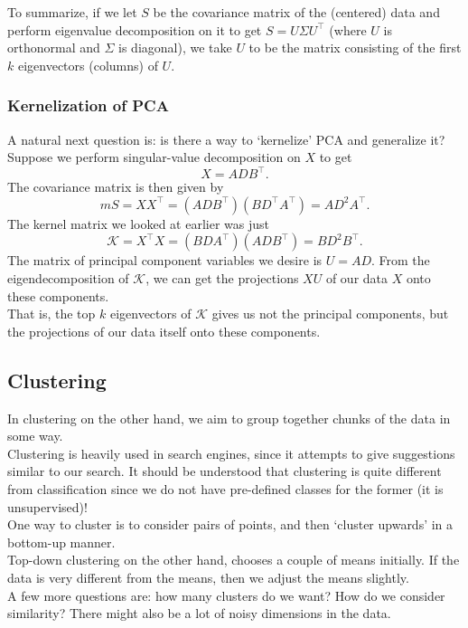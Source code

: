 \documentclass{article}
\begin{document}
			To summarize, if we let $S$ be the covariance matrix of the (centered) data and perform eigenvalue decomposition on it to get $S = U \Sigma U^\top$ (where $U$ is orthonormal and $\Sigma$ is diagonal), we take $U$ to be the matrix consisting of the first $k$ eigenvectors (columns) of $U$. 

		\subsubsection{Kernelization of PCA}

			A natural next question is: is there a way to `kernelize' PCA and generalize it? Suppose we perform singular-value decomposition on $X$ to get
			\[ X = ADB^\top. \]
			The covariance matrix is then given by
			\[ mS = XX^\top = (ADB^\top) (BD^\top A^\top) = AD^2A^\top. \]
			The kernel matrix we looked at earlier was just
			\[ \mathcal{K} = X^\top X = (BDA^\top) (ADB^\top) = BD^2B^\top. \]
			The matrix of principal component variables we desire is $U = AD$. From the eigendecomposition of $\mathcal{K}$, we can get the projections $XU$ of our data $X$ onto these components.\\
			That is, the top $k$ eigenvectors of $\mathcal{K}$ gives us not the principal components, but the projections of our data itself onto these components.


	\subsection{Clustering}

		In clustering on the other hand, we aim to group together chunks of the data in some way.\\
		Clustering is heavily used in search engines, since it attempts to give suggestions similar to our search. It should be understood that clustering is quite different from classification since we do not have pre-defined classes for the former (it is unsupervised)!\\

		One way to cluster is to consider pairs of points, and then `cluster upwards' in a bottom-up manner.\\
		Top-down clustering on the other hand, chooses a couple of means initially. If the data is very different from the means, then we adjust the means slightly.\\
		A few more questions are: how many clusters do we want? How do we consider similarity? There might also be a lot of noisy dimensions in the data.\\
\end{document}
